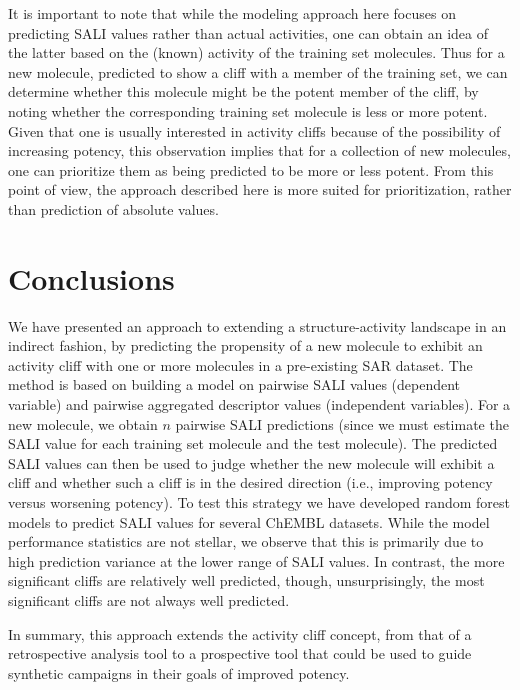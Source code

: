 \documentclass[letterpaper, 12pt]{article}
\begin{document}
It is important to note that while the modeling approach here focuses on predicting SALI values
rather than actual activities, one can obtain an idea of the latter based on the (known) activity of
the training set molecules. Thus for a new molecule, predicted to show a cliff with a member of the
training set, we can determine whether this molecule might be the potent member of the cliff, by
noting whether the corresponding training set molecule is less or more potent. Given that one is
usually interested in activity cliffs because of the possibility of increasing potency, this
observation implies that for a collection of new molecules, one can prioritize them as being
predicted to be more or less potent. From this point of view, the approach described here is more
suited for prioritization, rather than prediction of absolute values.

\section{Conclusions}
\label{sec:conclusions}

We have presented an approach to extending a structure-activity landscape in an indirect fashion, by
predicting the propensity of a new molecule to exhibit an activity cliff with one or more molecules
in a pre-existing SAR dataset. The method is based on building a model on pairwise SALI values
(dependent variable) and pairwise aggregated descriptor values (independent variables). For a new
molecule, we obtain $n$ pairwise SALI predictions (since we must estimate the SALI value for each
training set molecule and the test molecule). The predicted SALI values can then be used to judge
whether the new molecule will exhibit a cliff and whether such a cliff is in the desired direction
(i.e., improving potency versus worsening potency). To test this strategy we have developed random
forest models to predict SALI values for several ChEMBL datasets. While the model performance
statistics are not stellar, we observe that this is primarily due to high prediction variance at the
lower range of SALI values. In contrast, the more significant cliffs are relatively well predicted,
though, unsurprisingly, the most significant cliffs are not always well predicted.

In summary, this approach extends the activity cliff concept, from that of a retrospective analysis
tool to a prospective tool that could be used to guide synthetic campaigns in their goals of
improved potency.

\clearpage
\newpage
\end{document}
